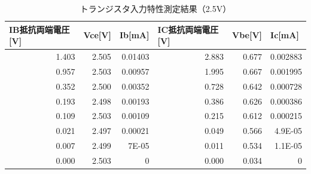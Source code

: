 \documentclass[titlepage]{jarticle}
\begin{document}
\begin{table}[htbp]
    \caption{トランジスタ入力特性測定結果（2.5V）}
    \begin{center}
        \begin{tabular}{r|r|r|r|r|r}
            \hline
            \multicolumn{1}{l|}{IB抵抗両端電圧[V]} & \multicolumn{1}{l|}{Vce[V]} & \multicolumn{1}{l|}{Ib[mA]} & \multicolumn{1}{l|}{IC抵抗両端電圧[V]} & \multicolumn{1}{l|}{Vbe[V]} & \multicolumn{1}{l}{Ic[mA]} \\ \hline
            1.403                                  & 2.505                       & 0.01403                     & 2.883                                  & 0.677                       & 0.002883                   \\ \hline
            0.957                                  & 2.503                       & 0.00957                     & 1.995                                  & 0.667                       & 0.001995                   \\ \hline
            0.352                                  & 2.500                       & 0.00352                     & 0.728                                  & 0.642                       & 0.000728                   \\ \hline
            0.193                                  & 2.498                       & 0.00193                     & 0.386                                  & 0.626                       & 0.000386                   \\ \hline
            0.109                                  & 2.503                       & 0.00109                     & 0.215                                  & 0.612                       & 0.000215                   \\ \hline
            0.021                                  & 2.497                       & 0.00021                     & 0.049                                  & 0.566                       & 4.9E-05                    \\ \hline
            0.007                                  & 2.499                       & 7E-05                       & 0.011                                  & 0.534                       & 1.1E-05                    \\ \hline
            0.000                                  & 2.503                       & 0                           & 0.000                                  & 0.034                       & 0                          \\ \hline
        \end{tabular}
    \end{center}
    \label{トランジスタ入力特性測定結果（2.5V）}
\end{table}
\end{document}

